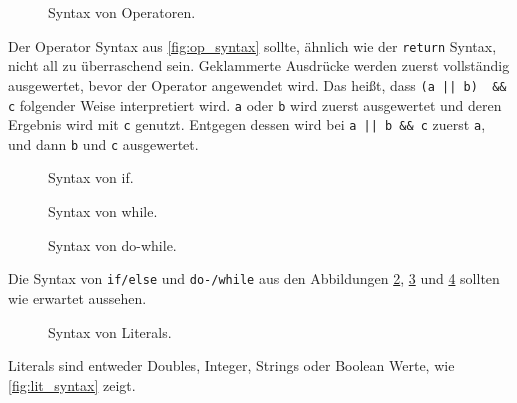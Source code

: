     \begin{figure}[H]
      \centering
      
      \caption{Syntax von Operatoren.}
      \label{fig:op_syntax}
    \end{figure}
    Der Operator Syntax aus \autoref{fig:op_syntax} sollte, ähnlich wie der \lstinline[style=MyMacroStyle]$return$ Syntax, nicht all zu überraschend sein. Geklammerte Ausdrücke werden zuerst vollständig ausgewertet, bevor der Operator angewendet wird. Das heißt, dass \lstinline[style=MyMacroStyle]$(a || b)  && c$ folgender Weise interpretiert wird. \lstinline[style=MyMacroStyle]$a$ oder \lstinline[style=MyMacroStyle]$b$ wird zuerst ausgewertet und deren Ergebnis wird mit \lstinline[style=MyMacroStyle]$c$ genutzt. Entgegen dessen wird bei \lstinline[style=MyMacroStyle]$a || b && c$ zuerst \lstinline[style=MyMacroStyle]$a$, und dann \lstinline[style=MyMacroStyle]$b$ und \lstinline[style=MyMacroStyle]$c$ ausgewertet.

    \begin{figure}[H]
      \centering
      
      \caption{Syntax von if.}
      \label{fig:if_syntax}
    \end{figure}

    \begin{figure}[H]
      \centering
      
      \caption{Syntax von while.}
      \label{fig:while_syntax}
    \end{figure}

    \begin{figure}[H]
      \centering
      
      \caption{Syntax von do-while.}
      \label{fig:do_while_syntax}
    \end{figure}
    Die Syntax von \lstinline[style=MyMacroStyle]$if/else$ und \lstinline[style=MyMacroStyle]$do-/while$ aus den Abbildungen \ref{fig:if_syntax}, \ref{fig:while_syntax} und \ref{fig:do_while_syntax} sollten wie erwartet aussehen.

    \begin{figure}[H]
      \centering
      
      \caption{Syntax von Literals.}
      \label{fig:lit_syntax}
    \end{figure}
    Literals sind entweder Doubles, Integer, Strings oder Boolean Werte, wie \autoref{fig:lit_syntax} zeigt.


